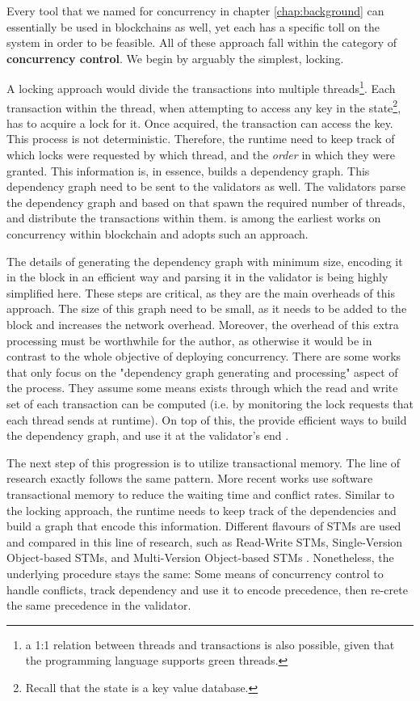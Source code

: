 
Every tool that we named for concurrency in chapter \ref{chap:background} can essentially be used in
blockchains as well, yet each has a specific toll on the system in order to be feasible. All
of these approach fall within the category of \textbf{concurrency control}. We begin by
arguably the simplest, locking.

A locking approach would divide the transactions into multiple threads\footnote{a 1:1 relation
between threads and transactions is also possible, given that the programming language supports
green threads.}. Each transaction within the thread, when attempting to access any key in the
state\footnote{Recall that the state is a key value database.}, has to acquire a lock for it. Once
acquired, the transaction can access the key. This process is not deterministic.
Therefore, the runtime need to keep track of which locks were requested by which thread, and the
\textit{order} in which they were granted. This information is, in essence, builds a dependency
graph. This dependency graph need to be sent to the validators as well. The validators parse the
dependency graph and based on that spawn the required number of threads, and distribute the
transactions within them. \cite{dickersonSmartLocksAddingConcurrency2017} is among the earliest
works on concurrency within blockchain and adopts such an approach.

The details of generating the dependency graph with minimum size, encoding it in the block in an
efficient way and parsing it in the validator is being highly simplified here. These steps are
critical, as they are the main overheads of this approach. The size of this graph need to be small,
as it needs to be added to the block and increases the network overhead. Moreover, the overhead of
this extra processing must be worthwhile for the author, as otherwise it would be in contrast to the
whole objective of deploying concurrency. There are some works that only focus on the "dependency
graph generating and processing" aspect of the process. They assume some means exists through which
the read and write set of each transaction can be computed (i.e. by monitoring the lock requests
that each thread sends at runtime). On top of this, the provide efficient ways to build the
dependency graph, and use it at the validator's end \cite{EnablingConcurrencySmart2018}.

The next step of this progression is to utilize transactional memory. The line of research exactly
follows the same pattern. More recent works use software transactional memory to reduce the waiting
time and conflict rates. Similar to the locking approach, the runtime needs to keep track of the
dependencies and build a graph that encode this information. Different flavours of STMs are used and
compared in this line of research, such as Read-Write STMs, Single-Version Object-based STMs, and
Multi-Version Object-based STMs
\cite{anjanaSTMEfficientConcurrent2019,anjanaSTMEfficientFramework2019}. Nonetheless, the underlying
procedure stays the same: Some means of concurrency control to handle conflicts, track dependency
and use it to encode precedence, then re-crete the same precedence in the validator.

